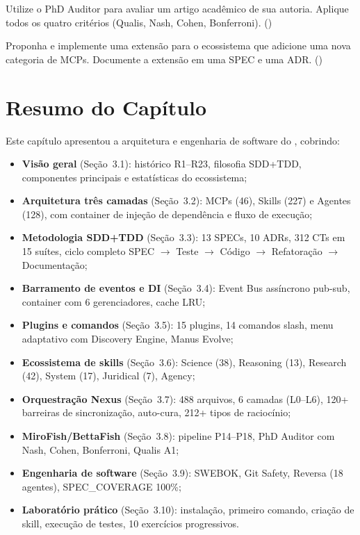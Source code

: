 \begin{exercicio}
Utilize o PhD Auditor para avaliar um artigo acadêmico de sua autoria.
Aplique todos os quatro critérios (Qualis, Nash, Cohen, Bonferroni).
(\nivelphd)
\end{exercicio}

\begin{exercicio}
Proponha e implemente uma extensão para o ecossistema que adicione
uma nova categoria de MCPs. Documente a extensão em uma SPEC e uma ADR.
(\nivelphd)
\end{exercicio}

\section*{Resumo do Capítulo}
\label{sec:resumo-cap3}

Este capítulo apresentou a arquitetura e engenharia de software do
\opencodeeco{}, cobrindo:

\begin{itemize}
\item \textbf{Visão geral} (Seção~3.1): histórico R1--R23, filosofia
SDD+TDD, componentes principais e estatísticas do ecossistema;
\item \textbf{Arquitetura três camadas} (Seção~3.2): MCPs (46),
Skills (227) e Agentes (128), com container de injeção de dependência
e fluxo de execução;
\item \textbf{Metodologia SDD+TDD} (Seção~3.3): 13 SPECs, 10 ADRs,
312 CTs em 15 suítes, ciclo completo SPEC $\to$ Teste $\to$ Código
$\to$ Refatoração $\to$ Documentação;
\item \textbf{Barramento de eventos e DI} (Seção~3.4): Event Bus
assíncrono pub-sub, container com 6 gerenciadores, cache LRU;
\item \textbf{Plugins e comandos} (Seção~3.5): 15 plugins, 14 comandos
slash, menu adaptativo com Discovery Engine, Manus Evolve;
\item \textbf{Ecossistema de skills} (Seção~3.6): Science (38),
Reasoning (13), Research (42), System (17), Juridical (7), Agency;
\item \textbf{Orquestração Nexus} (Seção~3.7): 488 arquivos, 6 camadas
(L0--L6), 120+ barreiras de sincronização, auto-cura, 212+ tipos de
raciocínio;
\item \textbf{MiroFish/BettaFish} (Seção~3.8): pipeline P14--P18,
PhD Auditor com Nash, Cohen, Bonferroni, Qualis A1;
\item \textbf{Engenharia de software} (Seção~3.9): SWEBOK, Git Safety,
Reversa (18 agentes), SPEC\_COVERAGE 100\%;
\item \textbf{Laboratório prático} (Seção~3.10): instalação, primeiro
comando, criação de skill, execução de testes, 10 exercícios
progressivos.
\end{itemize}

